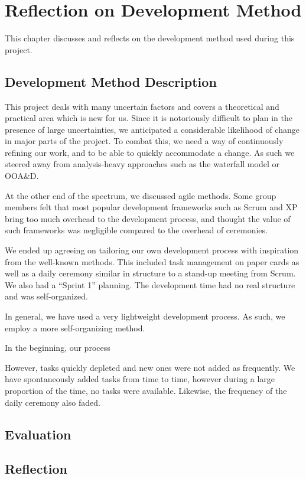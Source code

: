 \chapter{Reflection on Development Method}\label{chap:devmethodreflection}
This chapter discusses and reflects on the development method used during this project.

\section{Development Method Description}
This project deals with many uncertain factors and covers a theoretical and practical area which is new for us. Since it is notoriously difficult to plan in the presence of large uncertainties, we anticipated a considerable likelihood of change in major parts of the project. To combat this, we need a way of continuously refining our work, and to be able to quickly accommodate a change. As such we steered away from analysis-heavy approaches such as the waterfall model or OOA\&D\@.

At the other end of the spectrum, we discussed agile methods. Some group members felt that most popular development frameworks such as Scrum and XP bring too much overhead to the development process, and thought the value of such frameworks was negligible compared to the overhead of ceremonies.

We ended up agreeing on tailoring our own development process with inspiration from the well-known methods. This included task management on paper cards as well as a daily ceremony similar in structure to a stand-up meeting from Scrum. We also had a ``Sprint 1'' planning. The development time had no real structure and was self-organized.

In general, we have used a very lightweight development process. As such, we employ a more self-organizing method.

In the beginning, our process 

However, tasks quickly depleted and new ones were not added as frequently. We have spontaneously added tasks from time to time, however during a large proportion of the time, no tasks were available. Likewise, the frequency of the daily ceremony also faded.



\section{Evaluation}

\section{Reflection}